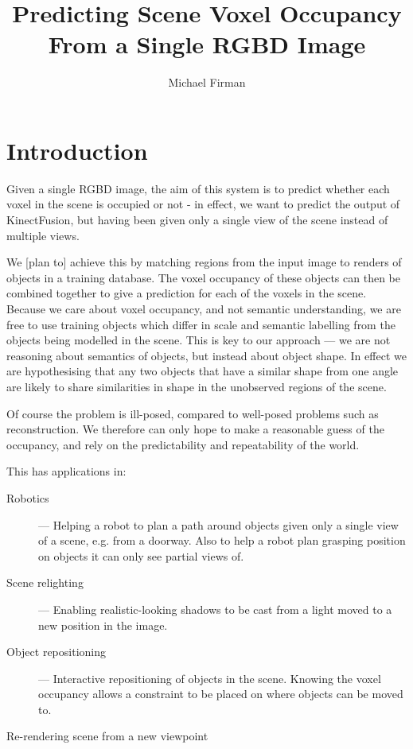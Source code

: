 \documentclass[10pt,a4paper]{article}
\title{Predicting Scene Voxel Occupancy From a Single RGBD Image}
\author{Michael Firman}
\begin{document}
\maketitle




\section{Introduction}

Given a single RGBD image, the aim of this system is to predict whether each voxel in the scene is occupied or not - in effect, we want to predict the output of KinectFusion, but having been given only a single view of the scene instead of multiple views.

We [plan to] achieve this by matching regions from the input image to renders of objects in a training database. The voxel occupancy of these objects can then be combined together to give a prediction for each of the voxels in the scene. Because we care about voxel occupancy, and not semantic understanding, we are free to use training objects which differ in scale and semantic labelling from the objects being modelled in the scene. This is key to our approach --- we are not reasoning about semantics of objects, but instead about object shape. In effect we are hypothesising that any two objects that have a similar shape from one angle are likely to share similarities in shape in the unobserved regions of the scene.

Of course the problem is ill-posed, compared to well-posed problems such as reconstruction. We therefore can only hope to make a reasonable guess of the occupancy, and rely on the predictability and repeatability of the world.


This has applications in:

\begin{description}

\item[Robotics] --- Helping a robot to plan a path around objects given only a single view of a scene, e.g. from a doorway. Also to help a robot plan grasping position on objects it can only see partial views of.

\item[Scene relighting] --- Enabling realistic-looking shadows to be cast from a light moved to a new position in the image.

\item[Object repositioning] --- Interactive repositioning of objects in the scene. Knowing the voxel occupancy allows a constraint to be placed on where objects can be moved to.

\item[Re-rendering scene from a new viewpoint]
\end{description}
\end{document}
